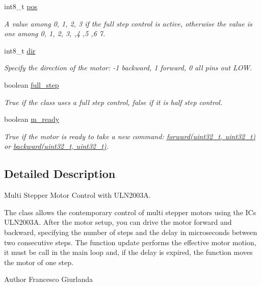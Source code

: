 \begin{DoxyCompactItemize}
int8\+\_\+t \hyperlink{class_m_s_m_c___u_l_n2003_a_a8318f5fbce84ff22c9d800e6b637bf52}{pos}
\begin{DoxyCompactList}\small\item\em A value among 0, 1, 2, 3 if the full step control is active, otherwise the value is one among 0, 1, 2, 3, ,4 ,5 ,6 7. \end{DoxyCompactList}\item 
int8\+\_\+t \hyperlink{class_m_s_m_c___u_l_n2003_a_af8b9f054cc60da4bb45567f80c907b94}{dir}
\begin{DoxyCompactList}\small\item\em Specify the direction of the motor\+: -\/1 backward, 1 forward, 0 all pins out L\+O\+W. \end{DoxyCompactList}\item 
boolean \hyperlink{class_m_s_m_c___u_l_n2003_a_a073628fcb2caa42e31ee542e7baffea9}{full\+\_\+step}
\begin{DoxyCompactList}\small\item\em True if the class uses a full step control, false if it is half step control. \end{DoxyCompactList}\item 
boolean \hyperlink{class_m_s_m_c___u_l_n2003_a_a4f2ee51f769815847a2a0062ff03bd6e}{m\+\_\+ready}
\begin{DoxyCompactList}\small\item\em True if the motor is ready to take a new command\+: \hyperlink{class_m_s_m_c___u_l_n2003_a_a9657492f948a75472b311bc0b823899f}{forward(uint32\+\_\+t, uint32\+\_\+t)} or \hyperlink{class_m_s_m_c___u_l_n2003_a_ac46e6ec6345f95b534079bcf2920885e}{backward(uint32\+\_\+t, uint32\+\_\+t)}. \end{DoxyCompactList}\end{DoxyCompactItemize}


\subsection{Detailed Description}
Multi Stepper Motor Control with U\+L\+N2003\+A. 

The class allows the contemporary control of multi stepper motors using the I\+Cs U\+L\+N2003\+A. After the motor setup, you can drive the motor forward and backward, specifying the number of steps and the delay in microseconds between two consecutive steps. The function update performs the effective motor motion, it must be call in the main loop and, if the delay is expired, the function moves the motor of one step. \begin{DoxyAuthor}{Author}
Francesco Giurlanda 
\end{DoxyAuthor}


